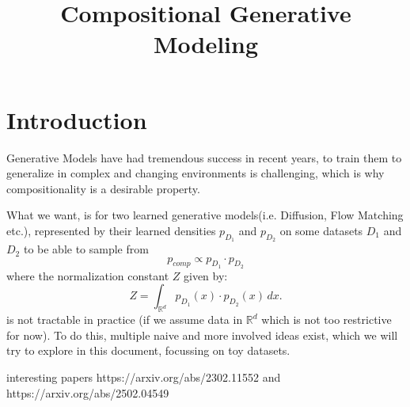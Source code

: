 \documentclass{article}
\title{Compositional Generative Modeling}
\author{ }
\date{}
\makeatletter
\newcommand{\mathleft}{\@fleqntrue\@mathmargin10pt}
\newcommand{\R}{\mathbb{R}}
\makeatother
\begin{document}
\maketitle

\newlength\breite
\setlength\breite{\linewidth-4pt}
\setlength\fboxsep{0pt}
\setlength\fboxrule{0.25pt}
\setlength{\abovedisplayskip}{3mm} %
\setlength{\belowdisplayskip}{3mm} %
\setlength\itemsep{0pt}
\setlength\parindent{0pt}


\mathleft

\section*{Introduction}

Generative Models have had tremendous success in recent years, to train them to generalize in complex and changing environments is challenging, which is why compositionality is a desirable property. 

What we want, is for two learned generative models(i.e. Diffusion, Flow Matching etc.), represented by their learned densities $p_{D_1}$ and $p_{D_2}$ on some datasets $D_1$ and $D_2$ to be able to sample from $$p_{comp} \propto p_{D_1} \cdot p_{D_2}$$ where the normalization constant $Z$ given by:
\[
Z = \int_{\R^d} p_{D_1}(x) \cdot p_{D_2}(x) \, dx.
\]
is not tractable in practice (if we assume data in $\R^d$ which is not too restrictive for now). To do this, multiple naive and more involved ideas exist, which we will try to explore in this document, focussing on toy datasets.

interesting papers https://arxiv.org/abs/2302.11552 and https://arxiv.org/abs/2502.04549
\end{document}
